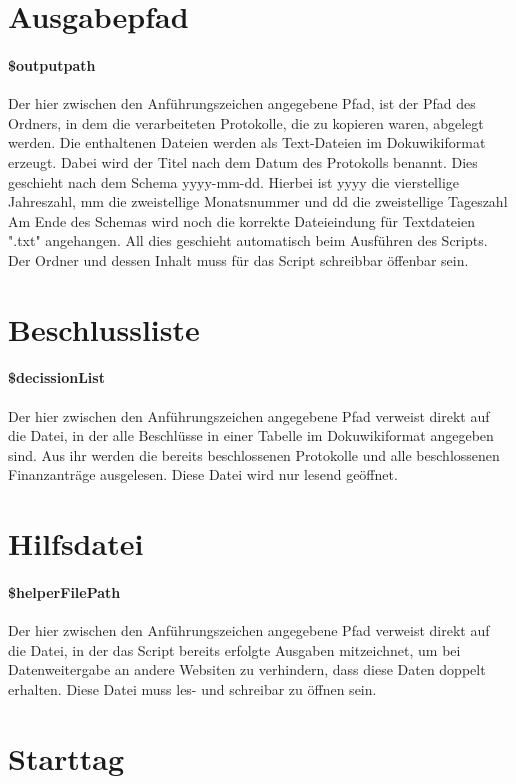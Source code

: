 \documentclass[12pt,parskip=full, pagea4]{scrreprt}
\begin{document}
	\section{Ausgabepfad}
	\paragraph{\$outputpath} Der hier zwischen den Anführungszeichen angegebene Pfad, ist der Pfad des Ordners, in dem die verarbeiteten Protokolle, die zu kopieren waren, abgelegt werden. Die enthaltenen Dateien werden als Text-Dateien im Dokuwikiformat erzeugt. Dabei wird der Titel nach dem Datum des Protokolls benannt. Dies geschieht nach dem Schema yyyy-mm-dd. Hierbei ist yyyy die vierstellige Jahreszahl, mm die zweistellige Monatsnummer und dd die zweistellige Tageszahl Am Ende des Schemas wird noch die korrekte Dateieindung für Textdateien ".txt" angehangen. All dies geschieht automatisch beim Ausführen des Scripts. Der Ordner und dessen Inhalt muss für das Script schreibbar öffenbar sein.
	
	\section{Beschlussliste}
	\paragraph{\$decissionList} Der hier zwischen den Anführungszeichen angegebene Pfad verweist direkt auf die Datei, in der alle Beschlüsse in einer Tabelle im Dokuwikiformat angegeben sind. Aus ihr werden die bereits beschlossenen Protokolle und alle beschlossenen Finanzanträge ausgelesen. Diese Datei wird nur lesend geöffnet. 
	
	\section{Hilfsdatei} 
	\paragraph{\$helperFilePath} Der hier zwischen den Anführungszeichen angegebene Pfad verweist direkt auf die Datei, in der das Script bereits erfolgte Ausgaben mitzeichnet, um bei Datenweitergabe an andere Websiten zu verhindern, dass diese Daten doppelt erhalten. Diese Datei muss les- und schreibar zu öffnen sein.
	
	\section{Starttag}
\end{document}
